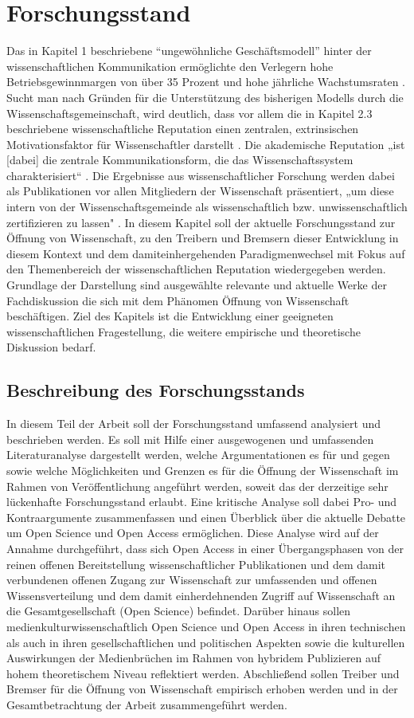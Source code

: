 \section{Forschungsstand}
Das in Kapitel 1 beschriebene “ungewöhnliche Geschäftsmodell” hinter der wissenschaftlichen Kommunikation ermöglichte den Verlegern hohe Betriebsgewinnmargen von über 35 Prozent  und hohe jährliche Wachstumsraten . Sucht man nach Gründen für die Unterstützung des bisherigen Modells durch die Wissenschaftsgemeinschaft, wird deutlich, dass vor allem die in Kapitel 2.3 beschriebene wissenschaftliche Reputation einen zentralen, extrinsischen Motivationsfaktor für Wissenschaftler darstellt . Die akademische Reputation „ist [dabei] die zentrale Kommunikationsform, die das Wissenschaftssystem charakterisiert“ . Die Ergebnisse aus wissenschaftlicher Forschung werden dabei als Publikationen vor allen Mitgliedern der Wissenschaft präsentiert, „um diese intern von der Wissenschaftsgemeinde als wissenschaftlich bzw. unwissenschaftlich zertifizieren zu lassen" . In diesem Kapitel soll der aktuelle Forschungsstand zur Öffnung von Wissenschaft, zu den Treibern und Bremsern dieser Entwicklung in diesem Kontext und dem damiteinhergehenden Paradigmenwechsel mit Fokus auf den Themenbereich der wissenschaftlichen Reputation wiedergegeben werden. Grundlage der Darstellung sind ausgewählte relevante und aktuelle Werke der Fachdiskussion die sich mit dem Phänomen Öffnung von Wissenschaft beschäftigen. Ziel des Kapitels ist die Entwicklung einer geeigneten wissenschaftlichen Fragestellung, die weitere empirische und theoretische Diskussion bedarf.
\subsection{Beschreibung des Forschungsstands}
In diesem Teil der Arbeit soll der Forschungsstand umfassend analysiert und beschrieben werden. Es soll mit Hilfe einer ausgewogenen und umfassenden Literaturanalyse dargestellt werden, welche Argumentationen es für und gegen sowie welche Möglichkeiten und Grenzen es für die Öffnung der Wissenschaft im Rahmen von Veröffentlichung angeführt werden, soweit das der derzeitige sehr lückenhafte Forschungsstand erlaubt. Eine kritische Analyse soll dabei Pro- und Kontraargumente zusammenfassen und einen Überblick über die aktuelle Debatte um Open Science und Open Access ermöglichen. Diese Analyse wird auf der Annahme durchgeführt, dass sich Open Access in einer Übergangsphasen von der reinen offenen Bereitstellung wissenschaftlicher Publikationen und dem damit verbundenen offenen Zugang zur Wissenschaft zur umfassenden und offenen Wissensverteilung und dem damit einherdehnenden Zugriff auf Wissenschaft an die Gesamtgesellschaft (Open Science) befindet. Darüber hinaus sollen medienkulturwissenschaftlich Open Science und Open Access in ihren technischen als auch in ihren gesellschaftlichen und politischen Aspekten sowie die kulturellen Auswirkungen der Medienbrüchen im Rahmen von hybridem Publizieren auf hohem theoretischem Niveau reflektiert werden. Abschließend sollen Treiber und Bremser für die Öffnung von Wissenschaft empirisch erhoben werden und in der Gesamtbetrachtung der Arbeit zusammengeführt werden.

